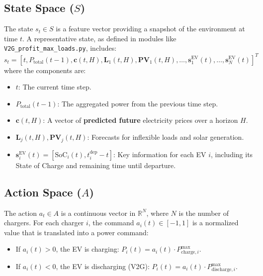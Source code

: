 \subsection{State Space ($S$)}
The state $s_t \in S$ is a feature vector providing a snapshot of the environment at time $t$. A representative state, as defined in modules like \texttt{V2G\_profit\_max\_loads.py}, includes:
\[
s_t = [t, P_{\text{total}}(t-1), \mathbf{c}(t, H), \mathbf{L}_1(t, H), \mathbf{PV}_1(t, H), \dots, \mathbf{s}^{\text{EV}}_1(t), \dots, \mathbf{s}^{\text{EV}}_N(t)]^T
\]
where the components are:
\begin{itemize}
    \item $t$: The current time step.
    \item $P_{\text{total}}(t-1)$: The aggregated power from the previous time step.
    \item $\mathbf{c}(t, H)$: A vector of \textbf{predicted future} electricity prices over a horizon $H$.
    \item $\mathbf{L}_j(t, H), \mathbf{PV}_j(t, H)$: Forecasts for inflexible loads and solar generation.
    \item $\mathbf{s}^{\text{EV}}_i(t) = [\text{SoC}_i(t), t^{\text{dep}}_i - t]$: Key information for each EV $i$, including its State of Charge and remaining time until departure.
\end{itemize}

\subsection{Action Space ($A$)}
The action $a_t \in A$ is a continuous vector in $\mathbb{R}^N$, where $N$ is the number of chargers. For each charger $i$, the command $a_i(t) \in [-1, 1]$ is a normalized value that is translated into a power command:
\begin{itemize}
    \item If $a_i(t) > 0$, the EV is charging: $P_i(t) = a_i(t) \cdot P^{\text{max}}_{\text{charge}, i}$.
    \item If $a_i(t) < 0$, the EV is discharging (V2G): $P_i(t) = a_i(t) \cdot P^{\text{max}}_{\text{discharge}, i}$.
\end{itemize}


